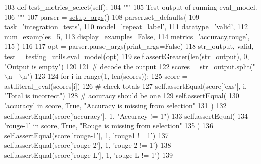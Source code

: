 \begin{DoxyCode}
103     \textcolor{keyword}{def }test\_metrics\_select(self):
104         \textcolor{stringliteral}{"""}
105 \textcolor{stringliteral}{        Test output of running eval\_model.}
106 \textcolor{stringliteral}{        """}
107         parser = \hyperlink{namespaceparlai_1_1chat__service_1_1services_1_1browser__chat_1_1client_a20c9862417d1f1a61b06551de0820ee4}{setup\_args}()
108         parser.set\_defaults(
109             task=\textcolor{stringliteral}{'integration\_tests'},
110             model=\textcolor{stringliteral}{'repeat\_label'},
111             datatype=\textcolor{stringliteral}{'valid'},
112             num\_examples=5,
113             display\_examples=\textcolor{keyword}{False},
114             metrics=\textcolor{stringliteral}{'accuracy,rouge'},
115         )
116 
117         opt = parser.parse\_args(print\_args=\textcolor{keyword}{False})
118         str\_output, valid, test = testing\_utils.eval\_model(opt)
119         self.assertGreater(len(str\_output), 0, \textcolor{stringliteral}{"Output is empty"})
120 
121         \textcolor{comment}{# decode the output}
122         scores = str\_output.split(\textcolor{stringliteral}{"\(\backslash\)n---\(\backslash\)n"})
123 
124         \textcolor{keywordflow}{for} i \textcolor{keywordflow}{in} range(1, len(scores)):
125             score = ast.literal\_eval(scores[i])
126             \textcolor{comment}{# check totals}
127             self.assertEqual(score[\textcolor{stringliteral}{'exs'}], i, \textcolor{stringliteral}{"Total is incorrect"})
128             \textcolor{comment}{# accuracy should be one}
129             self.assertEqual(
130                 \textcolor{stringliteral}{'accuracy'} \textcolor{keywordflow}{in} score, \textcolor{keyword}{True}, \textcolor{stringliteral}{"Accuracy is missing from selection"}
131             )
132             self.assertEqual(score[\textcolor{stringliteral}{'accuracy'}], 1, \textcolor{stringliteral}{"Accuracy != 1"})
133             self.assertEqual(
134                 \textcolor{stringliteral}{'rouge-1'} \textcolor{keywordflow}{in} score, \textcolor{keyword}{True}, \textcolor{stringliteral}{"Rouge is missing from selection"}
135             )
136             self.assertEqual(score[\textcolor{stringliteral}{'rouge-1'}], 1, \textcolor{stringliteral}{'rouge1 != 1'})
137             self.assertEqual(score[\textcolor{stringliteral}{'rouge-2'}], 1, \textcolor{stringliteral}{'rouge-2 != 1'})
138             self.assertEqual(score[\textcolor{stringliteral}{'rouge-L'}], 1, \textcolor{stringliteral}{'rouge-L != 1'})
139 
\end{DoxyCode}
\mbox{\label{classtests_1_1test__eval__model_1_1TestEvalModel_a06987267bf1d5f021f3ddcbe489a820f}} 
